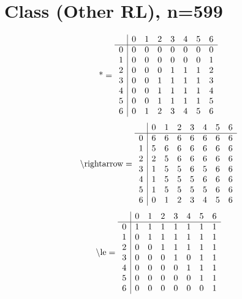 \documentclass[11pt]{article}
\begin{document}
\section{Class (Other RL), n=599}
\[\text{*} = 
\begin{array}{r | r r r r r r r}
 & 0 & 1 & 2 & 3 & 4 & 5 & 6 \\ \hline
0 & 0 & 0 & 0 & 0 & 0 & 0 & 0 \\
1 & 0 & 0 & 0 & 0 & 0 & 0 & 1 \\
2 & 0 & 0 & 0 & 1 & 1 & 1 & 2 \\
3 & 0 & 0 & 1 & 1 & 1 & 1 & 3 \\
4 & 0 & 0 & 1 & 1 & 1 & 1 & 4 \\
5 & 0 & 0 & 1 & 1 & 1 & 1 & 5 \\
6 & 0 & 1 & 2 & 3 & 4 & 5 & 6 \\
\end{array}
\]
\[\text{\textbackslash rightarrow} = 
\begin{array}{r | r r r r r r r}
 & 0 & 1 & 2 & 3 & 4 & 5 & 6 \\ \hline
0 & 6 & 6 & 6 & 6 & 6 & 6 & 6 \\
1 & 5 & 6 & 6 & 6 & 6 & 6 & 6 \\
2 & 2 & 5 & 6 & 6 & 6 & 6 & 6 \\
3 & 1 & 5 & 5 & 6 & 5 & 6 & 6 \\
4 & 1 & 5 & 5 & 5 & 6 & 6 & 6 \\
5 & 1 & 5 & 5 & 5 & 5 & 6 & 6 \\
6 & 0 & 1 & 2 & 3 & 4 & 5 & 6 \\
\end{array}
\]
\[\text{\textbackslash le} = 
\begin{array}{r | r r r r r r r}
 & 0 & 1 & 2 & 3 & 4 & 5 & 6 \\ \hline
0 & 1 & 1 & 1 & 1 & 1 & 1 & 1 \\
1 & 0 & 1 & 1 & 1 & 1 & 1 & 1 \\
2 & 0 & 0 & 1 & 1 & 1 & 1 & 1 \\
3 & 0 & 0 & 0 & 1 & 0 & 1 & 1 \\
4 & 0 & 0 & 0 & 0 & 1 & 1 & 1 \\
5 & 0 & 0 & 0 & 0 & 0 & 1 & 1 \\
6 & 0 & 0 & 0 & 0 & 0 & 0 & 1 \\
\end{array}
\]
\end{document}
